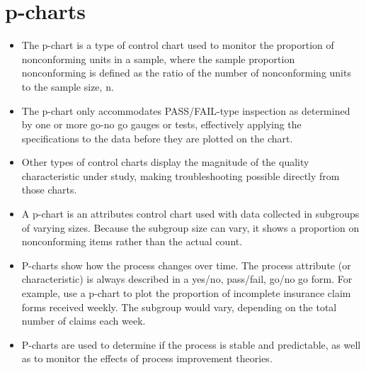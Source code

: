 \documentclass[a4paper,12pt]{article}
\begin{document}
\newpage
\section{p-charts}
\begin{itemize}
\item The p-chart is a type of control chart used to monitor the proportion of nonconforming units in a sample, where the sample proportion nonconforming is defined as the ratio of the number of nonconforming units to the sample size, n.
\item The p-chart only accommodates PASS/FAIL-type inspection as determined by one or more go-no go gauges or tests, effectively applying the specifications to the data before they are plotted on the chart. 
\item Other types of control charts display the magnitude of the quality characteristic under study, making troubleshooting possible directly from those charts.
\item A p-chart is an attributes control chart used with data collected in subgroups of varying sizes. Because the subgroup size can vary, it shows a proportion on nonconforming items rather than the actual count. 
\item P-charts show how the process changes over time. The process attribute (or characteristic) is always described in a yes/no, pass/fail, go/no go form. For example, use a p-chart to plot the proportion of incomplete insurance claim forms received weekly. The subgroup would vary, depending on the total number of claims each week. 
\item P-charts are used to determine if the process is stable and predictable, as well as to monitor the effects of process improvement theories.
\end{itemize}
\end{document}
